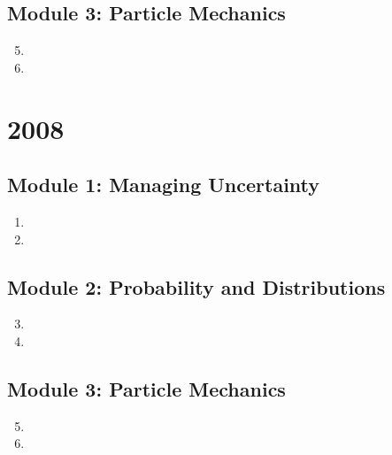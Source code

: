 \documentclass[fleqn,titlepage]{book}
\numberwithin{equation}{section}
\theoremstyle{plain}
\theoremstyle{definition}
\theoremstyle{remark}
\begin{document}
\section{Module 3: Particle Mechanics}
\begin{enumerate}[label=\bfseries  \arabic*.]\setcounter{enumi}{4}
\item 
\item 
\end{enumerate}

\chapter{2008}
\section{Module 1: Managing Uncertainty}
\begin{enumerate}[label=\bfseries  \arabic*.]\setcounter{enumi}{0}
\item 
\item 
\end{enumerate}
\section{Module 2: Probability and Distributions}
\begin{enumerate}[label=\bfseries  \arabic*.]\setcounter{enumi}{2}
\item 
\item 
\end{enumerate}
\section{Module 3: Particle Mechanics}
\begin{enumerate}[label=\bfseries  \arabic*.]\setcounter{enumi}{4}
\item 
\item 
\end{enumerate}


\end{document}
